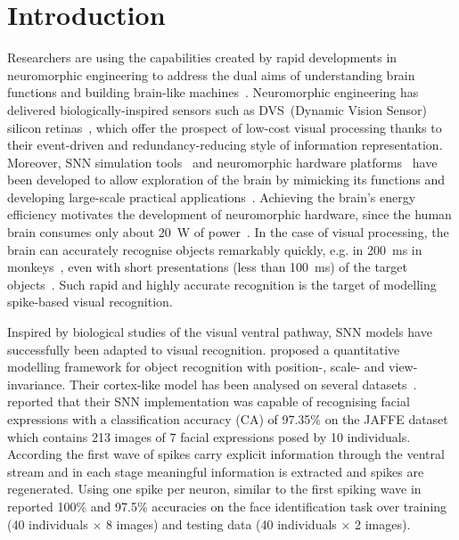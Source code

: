 \section{Introduction}
\label{sec:chapt6_intro}
Researchers are using the capabilities created by rapid developments in neuromorphic engineering to address the dual aims of understanding brain functions and building brain-like machines~\citep{furber2007neural}.
Neuromorphic engineering has delivered biologically-inspired sensors such as DVS~(Dynamic Vision Sensor) silicon retinas~\citep{serrano2013128, delbruck2008frame, yang2015dynamic, posch2014retinomorphic}, which offer the prospect of low-cost visual processing thanks to their event-driven and redundancy-reducing style of information representation.
Moreover, SNN simulation tools~\citep{davison2008pynn, gewaltig2007nest, goodman2008brian} and neuromorphic hardware platforms~\citep{furber2014spinnaker,  schemmel2010wafer,benjamin2014neurogrid,merolla2014million} have been developed to allow exploration of the brain by mimicking its functions and developing large-scale practical applications~\citep{eliasmith2012large}.
Achieving the brain's energy efficiency motivates the development of neuromorphic hardware, since the human brain consumes only about 20~W of power~\citep{drubach2000brain}.
In the case of visual processing, the brain can accurately recognise objects remarkably quickly, e.g. in 200~ms in monkeys~\citep{fabre1998rapid}, even with short presentations (less than 100~ms) of the target objects~\citep{keysers2001speed}.
Such rapid and highly accurate recognition is the target of modelling spike-based visual recognition.



Inspired by biological studies of the visual ventral pathway, SNN models have successfully been adapted to visual recognition.  \citet{riesenhuber1999hierarchical} proposed a quantitative modelling framework for object recognition with position-, scale- and view-invariance.
Their cortex-like model has been analysed on several datasets~\citep{serre2007robust}.
\protect{}
\protect{}\citet{fu2012spiking} reported that their SNN implementation was capable of recognising facial expressions with a classification accuracy (CA) of 97.35\% on the JAFFE dataset~\citep{lyons1998coding} which contains 213 images of 7 facial expressions posed by 10 individuals.
According \protect{} \protect{}\citet{vanrullen2002surfing}\protect\TLSins{,} the first wave of spikes carry explicit information through the ventral stream and in each stage meaningful information is extracted and spikes are regenerated. 
Using one spike per neuron, similar to the first spiking wave in \protect{} \protect{}\citet{delorme2001face} reported 100\% and 97.5\% accuracies on the face identification task over
training (40 individuals $\times$ 8 images) and testing data (40 individuals $\times$ 2 images).

